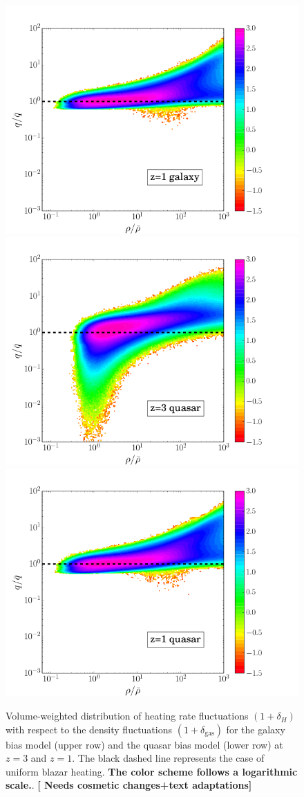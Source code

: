\documentclass[numberedappendix]{emulateapj}
\newcommand\ALc[1]{{\color{red} \bf #1}} %
\begin{document}
{\begin{figure}[h]
\includegraphics[width = .45\textwidth ]{delta_deltah_z1_gal2_ok.png}\\
\includegraphics[width = .45\textwidth ]{delta_deltah_z3_qso4_512b.png}
\includegraphics[width = .45\textwidth ]{delta_deltah_z1_qso4_512b.png}
\caption{Volume-weighted distribution of heating rate fluctuations $(1+\delta_H)$ with respect to the density fluctuations $(1+\delta_{\mathrm{gas}})$ for the galaxy bias model (upper row) and the quasar bias model (lower row) at $z=3$ and $z=1$. The black dashed line represents the case of uniform blazar heating. \ALc{The color scheme follows a logarithmic scale.}. \ALc{[{ Needs cosmetic changes+text adaptations}]}}
\label{fig:deltas}
\end{figure}
}
\end{document}
